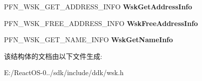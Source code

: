 \begin{DoxyCompactItemize}
P\+F\+N\+\_\+\+W\+S\+K\+\_\+\+G\+E\+T\+\_\+\+A\+D\+D\+R\+E\+S\+S\+\_\+\+I\+N\+FO {\bfseries Wsk\+Get\+Address\+Info}
\item 
\mbox{\label{struct___w_s_k___p_r_o_v_i_d_e_r___d_i_s_p_a_t_c_h_a2b1bb3e4191c8009b5aad2335a072b81}} 
P\+F\+N\+\_\+\+W\+S\+K\+\_\+\+F\+R\+E\+E\+\_\+\+A\+D\+D\+R\+E\+S\+S\+\_\+\+I\+N\+FO {\bfseries Wsk\+Free\+Address\+Info}
\item 
\mbox{\label{struct___w_s_k___p_r_o_v_i_d_e_r___d_i_s_p_a_t_c_h_a5bd8a2e841558bbf1d55125a1789ee2c}} 
P\+F\+N\+\_\+\+W\+S\+K\+\_\+\+G\+E\+T\+\_\+\+N\+A\+M\+E\+\_\+\+I\+N\+FO {\bfseries Wsk\+Get\+Name\+Info}
\end{DoxyCompactItemize}


该结构体的文档由以下文件生成\+:\begin{DoxyCompactItemize}
\item 
E\+:/\+React\+O\+S-\/0../sdk/include/ddk/wsk.\+h\end{DoxyCompactItemize}
